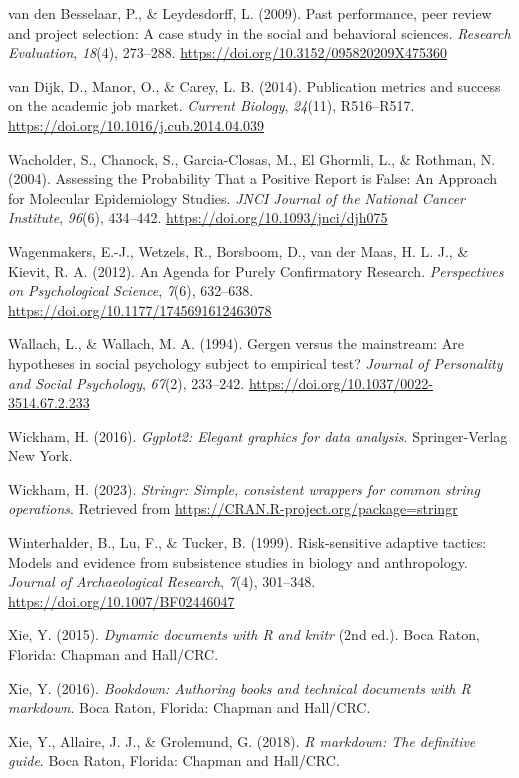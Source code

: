 \documentclass[
  british,
  a4paper,
  ,man,mask,floatsintext]{apa6}
\newlength{\cslhangindent}
\newenvironment{CSLReferences}[2] %
 {\begin{list}{}{%
  \setlength{\itemindent}{0pt}
  \setlength{\leftmargin}{0pt}
  \setlength{\parsep}{0pt}
  \ifodd #1
   \setlength{\leftmargin}{\cslhangindent}
   \setlength{\itemindent}{-1\cslhangindent}
  \fi
  \setlength{\itemsep}{#2\baselineskip}}}
 {\end{list}}
\begin{document}
\begin{CSLReferences}{1}{0}
van den Besselaar, P., \& Leydesdorff, L. (2009). Past performance, peer review and project selection: A case study in the social and behavioral sciences. \emph{Research Evaluation}, \emph{18}(4), 273--288. \url{https://doi.org/10.3152/095820209X475360}

van Dijk, D., Manor, O., \& Carey, L. B. (2014). Publication metrics and success on the academic job market. \emph{Current Biology}, \emph{24}(11), R516--R517. \url{https://doi.org/10.1016/j.cub.2014.04.039}

Wacholder, S., Chanock, S., Garcia-Closas, M., El Ghormli, L., \& Rothman, N. (2004). Assessing the {Probability That} a {Positive Report} is {False}: {An Approach} for {Molecular Epidemiology Studies}. \emph{JNCI Journal of the National Cancer Institute}, \emph{96}(6), 434--442. \url{https://doi.org/10.1093/jnci/djh075}

Wagenmakers, E.-J., Wetzels, R., Borsboom, D., van der Maas, H. L. J., \& Kievit, R. A. (2012). An {Agenda} for {Purely Confirmatory Research}. \emph{Perspectives on Psychological Science}, \emph{7}(6), 632--638. \url{https://doi.org/10.1177/1745691612463078}

Wallach, L., \& Wallach, M. A. (1994). Gergen versus the mainstream: {Are} hypotheses in social psychology subject to empirical test? \emph{Journal of Personality and Social Psychology}, \emph{67}(2), 233--242. \url{https://doi.org/10.1037/0022-3514.67.2.233}

Wickham, H. (2016). \emph{Ggplot2: {Elegant} graphics for data analysis}. Springer-Verlag New York.

Wickham, H. (2023). \emph{Stringr: Simple, consistent wrappers for common string operations}. Retrieved from \url{https://CRAN.R-project.org/package=stringr}

Winterhalder, B., Lu, F., \& Tucker, B. (1999). Risk-sensitive adaptive tactics: {Models} and evidence from subsistence studies in biology and anthropology. \emph{Journal of Archaeological Research}, \emph{7}(4), 301--348. \url{https://doi.org/10.1007/BF02446047}

Xie, Y. (2015). \emph{Dynamic documents with {R} and knitr} (2nd ed.). Boca Raton, Florida: {Chapman and Hall/CRC}.

Xie, Y. (2016). \emph{Bookdown: {Authoring} books and technical documents with {R} markdown}. Boca Raton, Florida: {Chapman and Hall/CRC}.

Xie, Y., Allaire, J. J., \& Grolemund, G. (2018). \emph{R markdown: {The} definitive guide}. Boca Raton, Florida: {Chapman and Hall/CRC}.

\end{CSLReferences}
\end{document}
